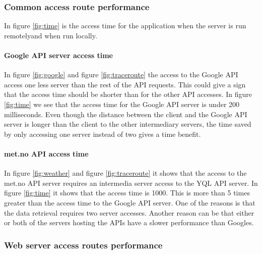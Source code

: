 \documentclass[10pt,a4paper]{article}
\begin{document}
\subsubsection{Common access route performance}
In figure \ref{fig:time} is the access time for the application when the server is run remotelyand when run locally.

\paragraph{Google API server access time} 
In figure \ref{fig:google} and figure \ref{fig:traceroute} the access to the Google API access one less server than the rest of the API requests. This could give a sign that the access time should be shorter than for the other API accesses. In figure \ref{fig:time} we see that the access time for the Google API server is under 200 milliseconds. Even though the distance between the client and the Google API server is longer than the client to the other intermediary servers, the time saved by only accessing one server instead of two gives a time benefit.

\paragraph{met.no API access time} 
In figure \ref{fig:weather} and figure \ref{fig:traceroute} it shows that the access to the met.no API server requires an intermedia server access to the YQL API server. In figure \ref{fig:time} it shows that the access time is 1000. This is more than 5 times greater than the access time to the Google API server. One of the reasons is that the data retrieval requires two server accesses. Another reason can be that either or both of the servers hosting the APIs have a slower performance than Googles.

\subsubsection{Web server access routes performance}
\end{document}
